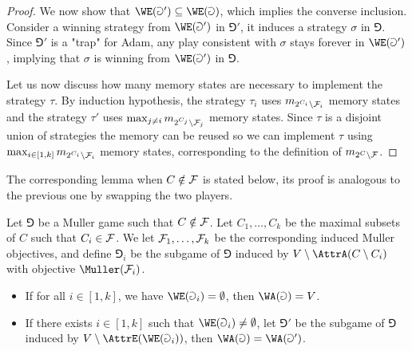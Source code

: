 \begin{proof}
We now show that $\WE(\Game') \subseteq \WE(\Game)$, which implies the converse inclusion.
Consider a winning strategy from $\WE(\Game')$ in $\Game'$, it induces a strategy $\sigma$ in $\Game$.
Since $\Game'$ is a "trap" for Adam, any play consistent with $\sigma$ stays forever in $\WE(\Game')$, 
implying that $\sigma$ is winning from $\WE(\Game')$ in $\Game$.

Let us now discuss how many memory states are necessary to implement the strategy $\tau$.
By induction hypothesis, the strategy $\tau_i$ uses $m_{2^{C_i} \setminus \mathcal{F}_i}$ memory states
and the strategy $\tau'$ uses $\max_{j \neq i} m_{2^{C_j} \setminus \mathcal{F}_j}$ memory states.
Since $\tau$ is a disjoint union of strategies the memory can be reused so we can implement $\tau$ using $\max_{i \in [1,k]} m_{2^{C_i} \setminus \mathcal{F}_i}$ memory states, corresponding to the definition of $m_{2^C \setminus \mathcal{F}}$.
\end{proof}

The corresponding lemma when $C \notin \mathcal{F}$ is stated below, its proof is analogous to the previous one by swapping the two players.

\begin{lemma}
\label{2-lem:McNaughton_Zielonka_odd}
Let $\Game$ be a Muller game such that $C \notin \mathcal{F}$.
Let $C_1, \dots, C_k$ be the maximal subsets of $C$ such that $C_i \in \mathcal{F}$.
We let $\mathcal{F}_1,\dots,\mathcal{F}_k$ be the corresponding induced Muller objectives,
and define $\Game_i$ be the subgame of $\Game$ induced by $V \setminus \AttrA(C \setminus C_i)$ with objective $\Muller(\F_i)$.
\begin{itemize}
	\item If for all $i \in [1,k]$, we have $\WE(\Game_i) = \emptyset$, then $\WA(\Game) = V$.
	\item If there exists $i \in [1,k]$ such that $\WE(\Game_i) \neq \emptyset$,
	let $\Game'$ be the subgame of $\Game$ induced by $V \setminus \AttrE( \WE(\Game_i) )$,
	then $\WA(\Game) = \WA(\Game')$.	
\end{itemize}
\end{lemma}

